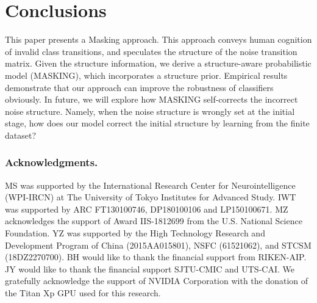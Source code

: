 \documentclass{article}
\begin{document}
\section{Conclusions}
This paper presents a Masking approach. This approach conveys human cognition of invalid class transitions, and speculates the structure of the noise transition matrix. Given the structure information, we derive a structure-aware probabilistic model (MASKING), which incorporates a structure prior. Empirical results demonstrate that our approach can improve the robustness of classifiers obviously. In future, we will explore how MASKING self-corrects the incorrect noise structure. Namely, when the noise structure is wrongly set at the initial stage, how does our model correct the initial structure by learning from the finite dataset?

\subsubsection*{Acknowledgments.}
MS was supported by the International Research Center for
Neurointelligence (WPI-IRCN) at The University of Tokyo Institutes for
Advanced Study. IWT was supported by ARC FT130100746, DP180100106 and LP150100671. MZ acknowledges the support of Award IIS-1812699 from the U.S. National Science Foundation. YZ was supported by the High Technology Research and Development Program of China (2015AA015801), NSFC (61521062), and STCSM (18DZ2270700). BH would like to thank the financial support from RIKEN-AIP. JY would like to thank the financial support SJTU-CMIC and UTS-CAI. We gratefully acknowledge the support of NVIDIA Corporation with the donation of the Titan Xp GPU used for this research.
\clearpage
\small
















\appendix
\clearpage
\end{document}
